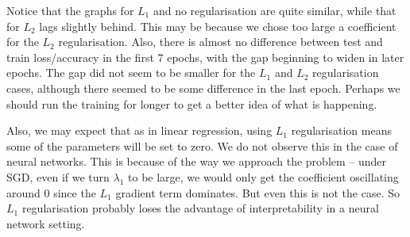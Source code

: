 \documentclass[11pt,a4paper]{article}
\begin{document}
Notice that the graphs for $L_1$ and no regularisation are quite similar, while that for $L_2$ lags slightly behind. This may be because we chose too large a coefficient for the $L_2$ regularisation. Also, there is almost no difference between test and train loss/accuracy in the first 7 epochs, with the gap beginning to widen in later epochs. The gap did not seem to be smaller for the $L_1$ and $L_2$ regularisation cases, although there seemed to be some difference in the last epoch. Perhaps we should run the training for longer to get a better idea of what is happening.

Also, we may expect that as in linear regression, using $L_1$ regularisation means some of the parameters will be set to zero. We do not observe this in the case of neural networks. This is because of the way we approach the problem -- under SGD, even if we turn $\lambda_1$ to be large, we would only get the coefficient oscillating around 0 since the $L_1$ gradient term dominates. But even this is not the case. So $L_1$ regularisation probably loses the advantage of interpretability in a neural network setting. \\
\end{document}
